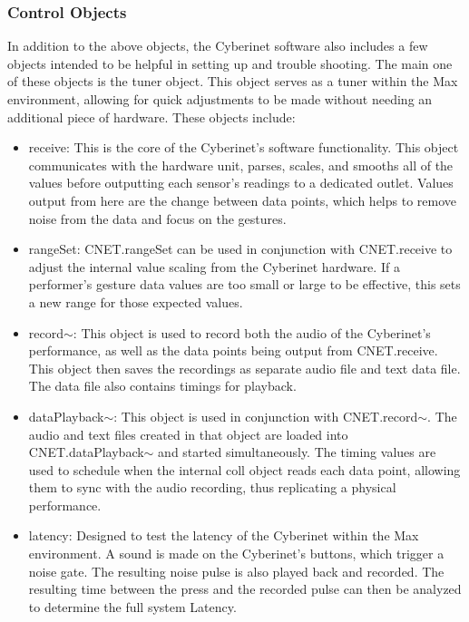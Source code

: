 
\subsubsection{Control Objects}

In addition to the above objects, the Cyberinet software also includes a few objects intended to be helpful in setting up and trouble shooting. The main one of these objects is the tuner object. This object serves as a tuner within the Max environment, allowing for quick adjustments to be made without needing an additional piece of hardware. These objects include:


\begin{itemize}
    \item receive: This is the core of the Cyberinet's software functionality. This object communicates with the hardware unit, parses, scales, and smooths all of the values before outputting each sensor's readings to a dedicated outlet. Values output from here are the change between data points, which helps to remove noise from the data and focus on the gestures.
    \item rangeSet: CNET.rangeSet can be used in conjunction with CNET.receive to adjust the internal value scaling from the Cyberinet hardware. If a performer's gesture data values are too small or large to be effective, this sets a new range for those expected values.
    \item record$\sim$: This object is used to record both the audio of the Cyberinet's performance, as well as the data points being output from CNET.receive. This object then saves the recordings as separate audio file and text data file. The data file also contains timings for playback.
    \item dataPlayback$\sim$: This object is used in conjunction with CNET.record$\sim$. The audio and text files created in that object are loaded into CNET.dataPlayback$\sim$ and started simultaneously. The timing values are used to schedule when the internal coll object reads each data point, allowing them to sync with the audio recording, thus replicating a physical performance.
    \item latency: Designed to test the latency of the Cyberinet within the Max environment. A sound is made on the Cyberinet's buttons, which trigger a noise gate. The resulting noise pulse is also played back and recorded. The resulting time between the press and the recorded pulse can then be analyzed to determine the full system Latency.

\end{itemize}
